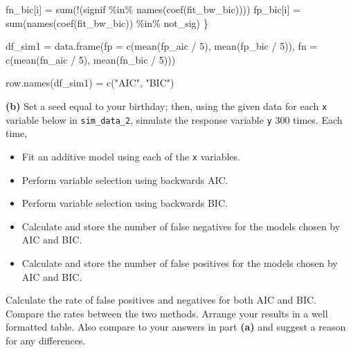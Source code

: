 \documentclass[
]{article}
\newenvironment{Shaded}{\begin{snugshade}}{\end{snugshade}}
\newcommand{\AttributeTok}[1]{\textcolor[rgb]{0.77,0.63,0.00}{#1}}
\newcommand{\DecValTok}[1]{\textcolor[rgb]{0.00,0.00,0.81}{#1}}
\newcommand{\FunctionTok}[1]{\textcolor[rgb]{0.00,0.00,0.00}{#1}}
\newcommand{\NormalTok}[1]{#1}
\newcommand{\OtherTok}[1]{\textcolor[rgb]{0.56,0.35,0.01}{#1}}
\newcommand{\SpecialCharTok}[1]{\textcolor[rgb]{0.00,0.00,0.00}{#1}}
\newcommand{\StringTok}[1]{\textcolor[rgb]{0.31,0.60,0.02}{#1}}
\providecommand{\tightlist}{%
  \setlength{\itemsep}{0pt}\setlength{\parskip}{0pt}}
\begin{document}
\begin{Shaded}
\begin{Highlighting}[]
  
\NormalTok{  fn\_bic[i] }\OtherTok{=} \FunctionTok{sum}\NormalTok{(}\SpecialCharTok{!}\NormalTok{(signif }\SpecialCharTok{\%in\%} \FunctionTok{names}\NormalTok{(}\FunctionTok{coef}\NormalTok{(fit\_bw\_bic))))}
\NormalTok{  fp\_bic[i] }\OtherTok{=} \FunctionTok{sum}\NormalTok{(}\FunctionTok{names}\NormalTok{(}\FunctionTok{coef}\NormalTok{(fit\_bw\_bic)) }\SpecialCharTok{\%in\%}\NormalTok{ not\_sig)}
\NormalTok{\}}

\NormalTok{df\_sim1 }\OtherTok{=} \FunctionTok{data.frame}\NormalTok{(}\AttributeTok{fp =} \FunctionTok{c}\NormalTok{(}\FunctionTok{mean}\NormalTok{(fp\_aic }\SpecialCharTok{/} \DecValTok{5}\NormalTok{), }\FunctionTok{mean}\NormalTok{(fp\_bic }\SpecialCharTok{/} \DecValTok{5}\NormalTok{)), }
                \AttributeTok{fn =} \FunctionTok{c}\NormalTok{(}\FunctionTok{mean}\NormalTok{(fn\_aic }\SpecialCharTok{/} \DecValTok{5}\NormalTok{), }\FunctionTok{mean}\NormalTok{(fn\_bic }\SpecialCharTok{/} \DecValTok{5}\NormalTok{)))}

\FunctionTok{row.names}\NormalTok{(df\_sim1) }\OtherTok{=} \FunctionTok{c}\NormalTok{(}\StringTok{"AIC"}\NormalTok{, }\StringTok{"BIC"}\NormalTok{)}
\end{Highlighting}
\end{Shaded}

\textbf{(b)} Set a seed equal to your birthday; then, using the given
data for each \texttt{x} variable below in \texttt{sim\_data\_2},
simulate the response variable \texttt{y} 300 times. Each time,

\begin{itemize}
\tightlist
\item
  Fit an additive model using each of the \texttt{x} variables.
\item
  Perform variable selection using backwards AIC.
\item
  Perform variable selection using backwards BIC.
\item
  Calculate and store the number of false negatives for the models
  chosen by AIC and BIC.
\item
  Calculate and store the number of false positives for the models
  chosen by AIC and BIC.
\end{itemize}

Calculate the rate of false positives and negatives for both AIC and
BIC. Compare the rates between the two methods. Arrange your results in
a well formatted table. Also compare to your answers in part
\textbf{(a)} and suggest a reason for any differences.
\end{document}
